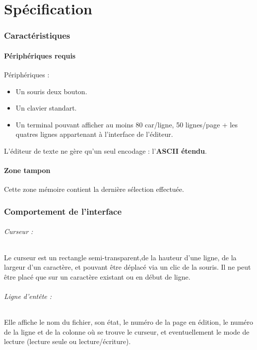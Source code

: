 \part{Spécification}

\section{Caractéristiques}
\subsection{Périphériques requis}
Périphériques :
\begin{itemize}
	\item Un souris deux bouton.
	\item Un clavier standart.
	\item Un terminal pouvant afficher au moins 80 car/ligne, 50 lignes/page + les quatres lignes appartenant à l'interface de l'éditeur.\\
\end{itemize}

L'éditeur de texte ne gère qu'un seul encodage : l'\textbf{ASCII étendu}.

\subsection{Zone tampon}
Cette zone mémoire contient la dernière sélection effectuée.

\section{Comportement de l'interface}

\paragraph{Curseur :} Le curseur est un rectangle semi-transparent,de la hauteur d'une ligne, de la largeur d'un caractère, et pouvant être déplacé via un clic de la souris. Il ne peut être placé que sur un caractère existant ou en début de ligne.

\paragraph{Ligne d'entête :} Elle affiche le nom du fichier, son état, le numéro de la page en édition, le numéro de la ligne et de la colonne où se trouve le curseur, et eventuellement le mode de lecture (lecture seule ou lecture/écriture).

